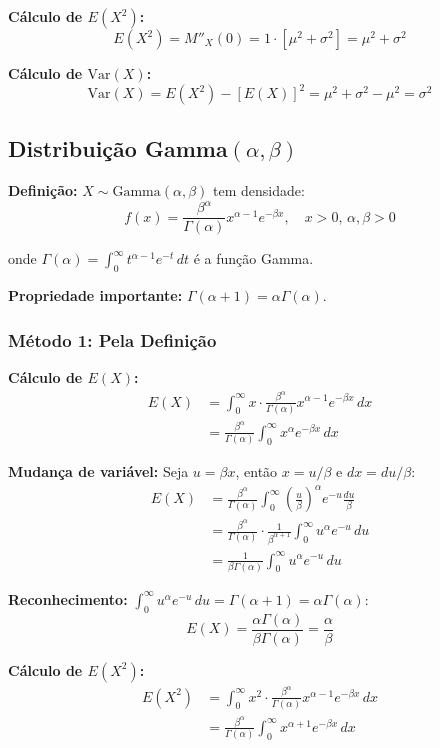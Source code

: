 \documentclass[12pt,a4paper]{article}
\theoremstyle{plain}
\theoremstyle{definition}
\theoremstyle{remark}
\begin{document}
\textbf{Cálculo de \(E(X^2)\):}
\[
E(X^2) = M''_X(0) = 1 \cdot [\mu^2 + \sigma^2] = \mu^2 + \sigma^2
\]

\textbf{Cálculo de \(\text{Var}(X)\):}
\[
\text{Var}(X) = E(X^2) - [E(X)]^2 = \mu^2 + \sigma^2 - \mu^2 = \sigma^2
\]

\subsection{Distribuição Gamma\((\alpha, \beta)\)}

\textbf{Definição:} \(X \sim \text{Gamma}(\alpha, \beta)\) tem densidade:
\[
f(x) = \frac{\beta^\alpha}{\Gamma(\alpha)} x^{\alpha-1} e^{-\beta x}, \quad x > 0, \, \alpha, \beta > 0
\]

onde \(\Gamma(\alpha) = \int_0^{\infty} t^{\alpha-1} e^{-t} \, dt\) é a função Gamma.

\textbf{Propriedade importante:} \(\Gamma(\alpha + 1) = \alpha \Gamma(\alpha)\).

\subsubsection{Método 1: Pela Definição}

\textbf{Cálculo de \(E(X)\):}
\begin{align}
E(X) &= \int_0^{\infty} x \cdot \frac{\beta^\alpha}{\Gamma(\alpha)} x^{\alpha-1} e^{-\beta x} \, dx \\
&= \frac{\beta^\alpha}{\Gamma(\alpha)} \int_0^{\infty} x^\alpha e^{-\beta x} \, dx
\end{align}

\textbf{Mudança de variável:} Seja \(u = \beta x\), então \(x = u/\beta\) e \(dx = du/\beta\):
\begin{align}
E(X) &= \frac{\beta^\alpha}{\Gamma(\alpha)} \int_0^{\infty} \left(\frac{u}{\beta}\right)^\alpha e^{-u} \frac{du}{\beta} \\
&= \frac{\beta^\alpha}{\Gamma(\alpha)} \cdot \frac{1}{\beta^{\alpha+1}} \int_0^{\infty} u^\alpha e^{-u} \, du \\
&= \frac{1}{\beta \Gamma(\alpha)} \int_0^{\infty} u^\alpha e^{-u} \, du
\end{align}

\textbf{Reconhecimento:} \(\int_0^{\infty} u^\alpha e^{-u} \, du = \Gamma(\alpha + 1) = \alpha \Gamma(\alpha)\):
\[
E(X) = \frac{\alpha \Gamma(\alpha)}{\beta \Gamma(\alpha)} = \frac{\alpha}{\beta}
\]

\textbf{Cálculo de \(E(X^2)\):}
\begin{align}
E(X^2) &= \int_0^{\infty} x^2 \cdot \frac{\beta^\alpha}{\Gamma(\alpha)} x^{\alpha-1} e^{-\beta x} \, dx \\
&= \frac{\beta^\alpha}{\Gamma(\alpha)} \int_0^{\infty} x^{\alpha+1} e^{-\beta x} \, dx
\end{align}
\end{document}

